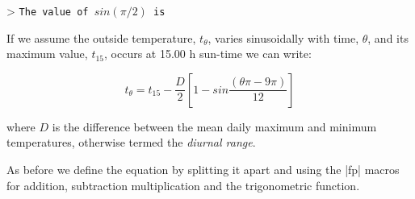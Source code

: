 \noindent > \texttt{The value of $sin{(\pi/2)}$ is \theta@t}

\makeatother


\bigskip
\normalsize

If we assume the outside temperature, $t_{\theta}$, varies sinusoidally with time, $\theta$, and its maximum
 value, $t_{15}$, occurs at 15.00 h sun-time we can write:

\begin{equation}
t_{\theta}=t_{15}-\frac{D}{2}\left[1-sin{\frac{(\theta\pi-9\pi)}{12}}\right] 
\label{diurnal}
\end{equation}

\noindent where $D$ is the difference between the mean daily maximum and minimum temperatures,
otherwise termed the \textit{diurnal range}.

As before we define the equation by splitting it apart and using the |fp| macros for addition, subtraction multiplication and the trigonometric function.



\begin{teX}
\def\ttheta#1#2#3{%
  \FPmul\ninepi{9}{\FPpi}%
  \FPmul\thetapi{#2}{\FPpi}%
  \FPsub\sina{\thetapi}{\ninepi}%
  \FPdiv\sinb{\sina}{12}
  \FPsin\sinc{\sinb}%
  \FPsub\ttwo{1}{\sinc}%
  \FPdiv\DD{#3}{2}%
  \FPmul\tthree{\DD}{\ttwo}
  \FPsub\finall{#1}{\tthree}
  \nprounddigits{3}\numprint{\finall}%
}
\end{teX}


\def\ttheta#1#2#3{%
\FPmul\ninepi{9}{\FPpi}%
\FPmul\thirteenpi{#2}{\FPpi}%
\FPsub\sina{\thirteenpi}{\ninepi}%
\FPdiv\sinb{\sina}{12}
\FPsin\sinc{\sinb}%
\FPsub\ttwo{1}{\sinc}%
\FPdiv\DD{#3}{2}%
\FPmul\tthree{\DD}{\ttwo}
\FPsub\finall{#1}{\tthree}
\nprounddigits{3}\numprint{\finall}%
}




